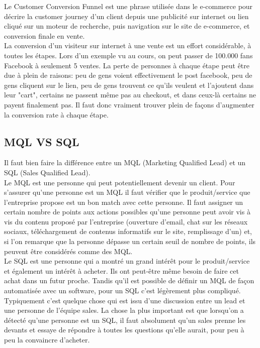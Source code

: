 Le Customer Conversion Funnel est une phrase utilisée dans le e-commerce pour décrire la customer journey d'un client depuis une publicité sur internet ou lien cliqué sur un moteur de recherche, puis navigation sur le site de e-commerce, et conversion finale en vente.\\

La conversion d'un visiteur sur internet à une vente est un effort considérable, à toutes les étapes. Lors d'un exemple vu au cours, on peut passer de 100.000 fans Facebook à seulement 5 ventes. La perte de personnes à chaque étape peut être due à plein de raisons: peu de gens voient effectivement le post facebook, peu de gens cliquent sur le lien, peu de gens trouvent ce qu'ils veulent et l'ajoutent dans leur "cart", certains ne passent même pas au checkout, et dans ceux-là certains ne payent finalement pas. Il faut donc vraiment trouver plein de façons d'augmenter la conversion rate à chaque étape.\\

\newpage
\subsection{MQL VS SQL}

Il faut bien faire la différence entre un MQL (Marketing Qualified Lead) et un SQL (Sales Qualified Lead). \\

Le MQL est une personne qui peut potentiellement devenir un client. Pour s'assurer qu'une personne est un MQL il faut vérifier que le produit/service que l'entreprise propose est un bon match avec cette personne. Il faut assigner un certain nombre de points aux actions possibles qu'une personne peut avoir vis à vis du contenu proposé par l'entreprise (ouverture d'email, chat sur les réseaux sociaux, téléchargement de contenus informatifs sur le site, remplissage d'un) et, si l'on remarque que la personne dépasse un certain seuil de nombre de points, ils peuvent être considérés comme des MQL.\\

Le SQL est une personne qui a montré un grand intérêt pour le produit/service et également un intérêt à acheter. Ils ont peut-être même besoin de faire cet achat dans un futur proche. Tandis qu'il est possible de définir un MQL de façon automatisée avec un software, pour un SQL c'est légèrement plus compliqué. Typiquement c'est quelque chose qui est issu d'une discussion entre un lead et une personne de l'équipe sales. La chose la plus important est que lorsqu'on a détecté qu'une personne est un SQL, il faut absolument qu'un sales prenne les devants et essaye de répondre à toutes les questions qu'elle aurait, pour peu à peu la convaincre d'acheter.\\

